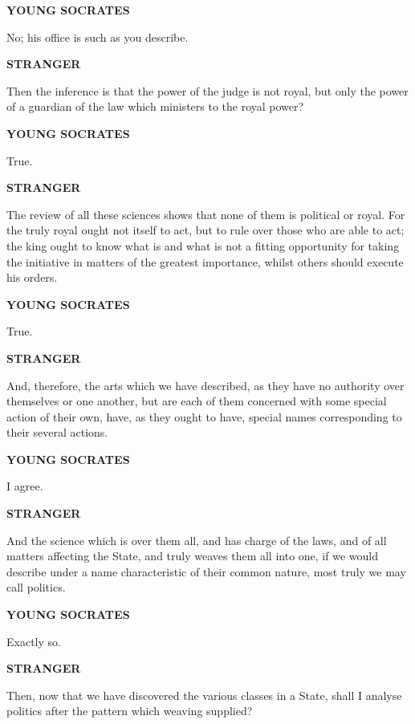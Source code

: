 \documentclass[11pt,letter]{article}
\begin{document}
\par \textbf{YOUNG SOCRATES}
\par   No; his office is such as you describe.

\par \textbf{STRANGER}
\par   Then the inference is that the power of the judge is not royal, but only the power of a guardian of the law which ministers to the royal power?

\par \textbf{YOUNG SOCRATES}
\par   True.

\par \textbf{STRANGER}
\par   The review of all these sciences shows that none of them is political or royal. For the truly royal ought not itself to act, but to rule over those who are able to act; the king ought to know what is and what is not a fitting opportunity for taking the initiative in matters of the greatest importance, whilst others should execute his orders.

\par \textbf{YOUNG SOCRATES}
\par   True.

\par \textbf{STRANGER}
\par   And, therefore, the arts which we have described, as they have no authority over themselves or one another, but are each of them concerned with some special action of their own, have, as they ought to have, special names corresponding to their several actions.

\par \textbf{YOUNG SOCRATES}
\par   I agree.

\par \textbf{STRANGER}
\par   And the science which is over them all, and has charge of the laws, and of all matters affecting the State, and truly weaves them all into one, if we would describe under a name characteristic of their common nature, most truly we may call politics.

\par \textbf{YOUNG SOCRATES}
\par   Exactly so.

\par \textbf{STRANGER}
\par   Then, now that we have discovered the various classes in a State, shall I analyse politics after the pattern which weaving supplied?
\end{document}
